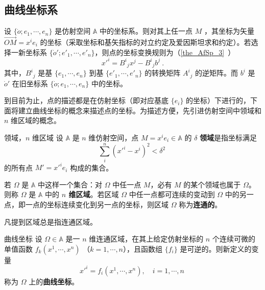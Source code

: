 

\subsection{曲线坐标系}
设 $\{\dot o;e_1,\cdots,e_n\}$ 是仿射空间 $\mathbb A$ 中的坐标系。则对其上任一点 $M$ ，其坐标为矢量 $\overrightarrow{OM}=x^i e_i$ 的坐标（采取坐标和基矢指标的对立约定及爱因斯坦求和约定）。若选择一新坐标系 $\{\dot o';e'_1,\cdots,e'_n\}$，则点的坐标变换规则为（\autoref{the_AfSp_3}~）
\begin{equation}
x'^i={B^i}_jx^j-{B^i}_j b^j~.
\end{equation}
其中，${B^i}_j$ 是基 $\{e_1,\cdots,e_n\}$ 到基 $\{e'_1,\cdots,e'_n\}$ 的转换矩阵 ${A^i}_j$ 的逆矩阵。而 $b^i$ 是 $\dot o'$ 在旧坐标系 $\{\dot o;e_1,\cdots,e_n\}$ 中的坐标。

到目前为止，点的描述都是在仿射坐标（即对应基底 $\{e_i\}$ 的坐标）下进行的，下面将建立曲线坐标的概念来描述点的坐标。为描述方便，先引进仿射空间中领域和 $n$ 维区域的概念。
\begin{definition}{领域，$n$ 维区域}
设 $\mathbb A$ 是 $n$ 维仿射空间，点 $M=x^ie_i\in\mathbb A$ 的 $\delta$ \textbf{领域}是指坐标满足
\begin{equation}
\sum_{i}^n(x'^i-x^i)^2<\delta^2~
\end{equation}
的所有点 $M'=x'^i e_i$ 构成的集合。

若 $\Omega$ 是 $\mathbb A$ 中这样一个集合：对 $\Omega$ 中任一点 $M$，必有 $M$ 的某个领域也属于 $\Omega$。则称 $\Omega$ 是 $\mathbb A$ 中的\textbf{ $n$ 维区域}。若区域 $\Omega$ 中任一点都可连续的变动到 $\Omega$ 中的另一点，即一点的坐标连续变化到另一点的坐标，则区域 $\Omega$ 称为\textbf{连通的}。
\end{definition}

凡提到区域总是指连通区域。

\begin{definition}{曲线坐标}
设 $\Omega\in\mathbb A$ 是一 $n$ 维连通区域，在其上给定仿射坐标的 $n$ 个连续可微的单值函数 $f_k(x^1,\cdots,x^n)$ （$k=1,\cdots,n$），且函数组 $\{f_i\}$ 是可逆的。则新定义的变量
\begin{equation}
x'^i=f_i(x^1,\cdots,x^n),\quad i=1,\cdots,n~
\end{equation}
称为 $\Omega$ 上的\textbf{曲线坐标}。
\end{definition}

